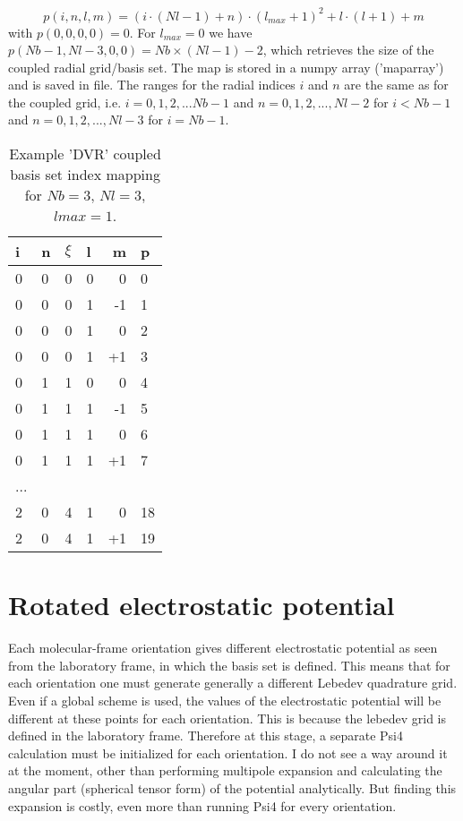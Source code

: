 \documentclass[a4paper,american,floatfix,pdftex,superscriptaddress,twoside,%
aps,pra,
linenumbers,%
reprint,%
]{revtex4-2}%
\begin{document}
\begin{equation}
p(i,n,l,m) = \left(i\cdot (Nl-1) + n\right) \cdot \left( l_{max}+1\right)^2 +l\cdot(l+1) + m
\end{equation} 
with $p(0,0,0,0) =0 $. For $l_{max} = 0$ we have $p(Nb-1,Nl-3,0,0) =  Nb \times (Nl - 1) -2 $, which retrieves the size of the coupled radial grid/basis set. The map is stored in a numpy array ('maparray') and is saved in file. The ranges for the radial indices $i$ and $n$ are the same as for the coupled grid, i.e. $i=0,1,2,...Nb-1$ and $n=0,1,2,...,Nl-2$ for $i<Nb-1$ and $n=0,1,2,...,Nl-3$ for $i=Nb-1$.
\begin{table}[h!]
	\begin{center}
		\caption{Example 'DVR' coupled basis set index mapping for $Nb=3$, $Nl=3$, $lmax=1$.}
		\label{tab:mapping}
		\begin{tabular}{l|l|l|l|r|l}
			\textbf{i} & \textbf{n} & \textbf{$\xi$} & \textbf{l} &\textbf{m} & \textbf{p}\\
			\hline
			0 & 0 & 0 & 0 &0 & 0\\
			0 & 0 & 0 & 1 &-1 & 1\\
			0 & 0 & 0 & 1 &0 & 2\\
			0 & 0 & 0 & 1 &+1 & 3\\
			0 & 1 & 1 & 0 &0 & 4\\
			0 & 1 & 1 & 1 &-1 & 5\\
			0 & 1 & 1 & 1 &0 & 6\\
			0 & 1 & 1 & 1 &+1 & 7\\
			...\\
			2 & 0 & 4 & 1 &0 & 18\\
			2 & 0 & 4 & 1 &+1 & 19\\		
		\end{tabular}
	\end{center}
\end{table}


\section{Rotated electrostatic potential}
Each molecular-frame orientation gives different electrostatic potential as seen from the laboratory frame, in which the basis set is defined. This means that for each orientation one must generate generally a different Lebedev quadrature grid. Even if a global scheme is used, the values of the electrostatic potential will be different at these points for each orientation. This is because the lebedev grid is defined in the laboratory frame. Therefore at this stage, a separate Psi4 calculation must be initialized for each orientation. I do not see a way around it at the moment, other than performing multipole expansion and calculating the angular part (spherical tensor form) of the potential analytically. But finding this expansion is costly, even more than running Psi4 for every orientation.
\end{document}
